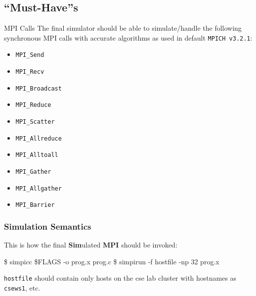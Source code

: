 \documentclass[pdf]{beamer}
\begin{document}
\subsection{``Must-Have''s}
\begin{frame}{MPI Calls}
  The final simulator should be able to simulate/handle the following synchronous
  MPI calls with accurate algorithms as used in default \texttt{MPICH v3.2.1}:
  \begin{itemize}
    \item \texttt{MPI\_Send}
    \item \texttt{MPI\_Recv}
    \item \texttt{MPI\_Broadcast}
    \item \texttt{MPI\_Reduce}
    \item \texttt{MPI\_Scatter}
    \item \texttt{MPI\_Allreduce}
    \item \texttt{MPI\_Alltoall}
    \item \texttt{MPI\_Gather}
    \item \texttt{MPI\_Allgather}
    \item \texttt{MPI\_Barrier}
  \end{itemize}
\end{frame}
\begin{frame}[fragile]
  \frametitle{Simulation Semantics}
  This is how the final \textbf{Sim}ulated \textbf{MPI} should be invoked:
\begin{semiverbatim}
\$ simpicc \$FLAGS -o prog.x prog.c
\$ simpirun -f hostfile -np 32 prog.x
\end{semiverbatim}
  \texttt{hostfile} should contain only hosts on the cse lab cluster with
  hostnames as \texttt{csews1}, etc.
\end{frame}
\end{document}
